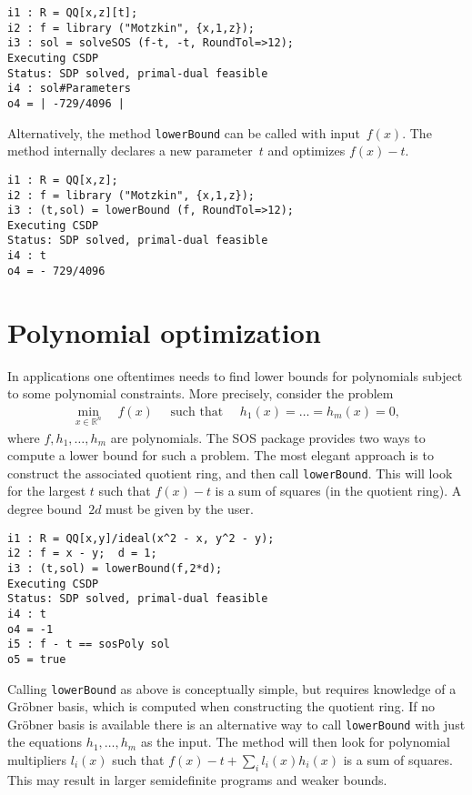 \documentclass[11pt]{amsart}
\theoremstyle{plain}%
\theoremstyle{definition}
\theoremstyle{remark}
\newcommand{\SOS}{\textsc{SOS}\xspace}
\newcommand{\RR}{\mathbb{R}}
\begin{document}
{\small
\begin{verbatim}
i1 : R = QQ[x,z][t];
i2 : f = library ("Motzkin", {x,1,z});
i3 : sol = solveSOS (f-t, -t, RoundTol=>12);
Executing CSDP
Status: SDP solved, primal-dual feasible
i4 : sol#Parameters
o4 = | -729/4096 |
\end{verbatim}
}

\noindent
Alternatively, the method \verb|lowerBound| can be called with input~$f(x)$.
The method internally declares a new parameter~$t$ and optimizes $f(x)-t$.
{\small
\begin{verbatim}
i1 : R = QQ[x,z];
i2 : f = library ("Motzkin", {x,1,z});
i3 : (t,sol) = lowerBound (f, RoundTol=>12);
Executing CSDP
Status: SDP solved, primal-dual feasible
i4 : t
o4 = - 729/4096
\end{verbatim}
}

\section{Polynomial optimization}

In applications one oftentimes needs to find lower bounds for polynomials subject to some polynomial constraints.
More precisely, consider the problem
\begin{align*}
  \min_{x\in \RR^n} \quad f(x)
  \quad \text{ such that }\quad
  h_1(x)=\dots=h_m(x)=0,
\end{align*}
where $f, h_1,\dots,h_m$ are polynomials.
The \SOS package provides two ways to compute a lower bound for such a problem.
The most elegant approach is to construct the associated quotient ring, and then call \verb|lowerBound|.
This will look for the largest $t$ such that $f(x)-t$ is a sum of squares (in the quotient ring).
A degree bound~$2d$ must be given by the user.

{\small
\begin{verbatim}
i1 : R = QQ[x,y]/ideal(x^2 - x, y^2 - y);
i2 : f = x - y;  d = 1;
i3 : (t,sol) = lowerBound(f,2*d);
Executing CSDP
Status: SDP solved, primal-dual feasible
i4 : t
o4 = -1
i5 : f - t == sosPoly sol
o5 = true
\end{verbatim}
}

Calling \verb|lowerBound| as above is conceptually simple, but requires knowledge of a Gröbner basis, which is computed when constructing the quotient ring.
If no Gröbner basis is available there is an alternative way to call \verb|lowerBound| with just the equations $h_1,\dots,h_m$ as the input.
The method will then look for polynomial multipliers $l_i(x)$ such that $f(x) - t + \sum_i l_i(x)h_i(x)$ is a sum of squares.
This may result in larger semidefinite programs and weaker bounds.
\end{document}
